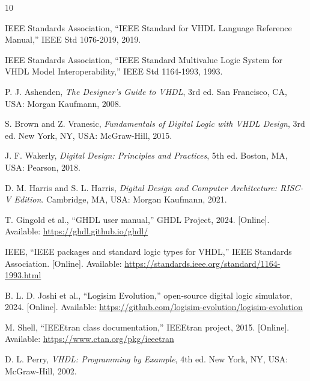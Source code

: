 \documentclass[conference]{IEEEtran}
\begin{document}
\begin{thebibliography}{10}

IEEE Standards Association, ``IEEE Standard for VHDL Language Reference
Manual,'' IEEE Std 1076-2019, 2019.

IEEE Standards Association, ``IEEE Standard Multivalue Logic System for VHDL
Model Interoperability,'' IEEE Std 1164-1993, 1993.

P. J. Ashenden, \emph{The Designer's Guide to VHDL}, 3rd ed.
San Francisco, CA, USA: Morgan Kaufmann, 2008.

S. Brown and Z. Vranesic, \emph{Fundamentals of Digital Logic with VHDL
Design}, 3rd ed. New York, NY, USA: McGraw-Hill, 2015.

J. F. Wakerly, \emph{Digital Design: Principles and Practices}, 5th ed.
Boston, MA, USA: Pearson, 2018.

D. M. Harris and S. L. Harris, \emph{Digital Design and Computer
Architecture: RISC-V Edition}. Cambridge, MA, USA: Morgan Kaufmann, 2021.

T. Gingold et al., ``GHDL user manual,'' GHDL Project, 2024. [Online].
Available: \url{https://ghdl.github.io/ghdl/}

IEEE, ``IEEE packages and standard logic types for VHDL,'' IEEE Standards
Association. [Online]. Available:
\url{https://standards.ieee.org/standard/1164-1993.html}

B. L. D. Joshi et al., ``Logisim Evolution,'' open-source digital logic
simulator, 2024. [Online]. Available:
\url{https://github.com/logisim-evolution/logisim-evolution}

M. Shell, ``IEEEtran class documentation,'' IEEEtran project, 2015.
[Online]. Available: \url{https://www.ctan.org/pkg/ieeetran}

D. L. Perry, \emph{VHDL: Programming by Example}, 4th ed. New York, NY,
USA: McGraw-Hill, 2002.

\end{thebibliography}
\end{document}
